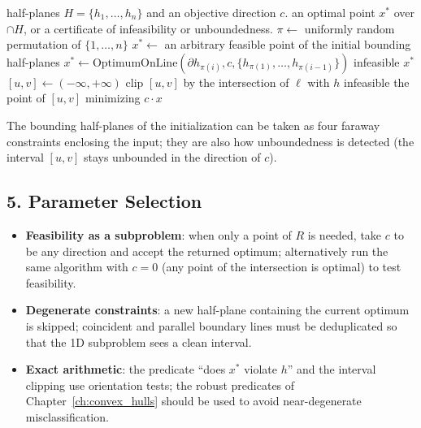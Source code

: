 \begin{algorithm}[htbp]
\caption{Seidel's Randomized Incremental 2D LP}
\label{alg:geo_duality_seidel_lp}
\begin{algorithmic}[1]
\Require half-planes $H = \{h_1, \dots, h_n\}$ and an objective direction $c$.
\Ensure an optimal point $x^*$ over $\cap H$, or a certificate of
       infeasibility or unboundedness.
  \State $\pi \gets$ uniformly random permutation of $\{1, \dots, n\}$
  \State $x^* \gets$ an arbitrary feasible point of the initial bounding
         half-planes
      \State $x^* \gets \text{OptimumOnLine}(\partial h_{\pi(i)}, c,
             \{h_{\pi(1)}, \dots, h_{\pi(i-1)}\})$
        \State \Return infeasible
      \EndIf
    \EndIf
  \EndFor
  \State \Return $x^*$
\EndFunction
{}
  \State $[u, v] \gets (-\infty, +\infty)$ 
    \State clip $[u,v]$ by the intersection of $\ell$ with $h$
  \EndFor
    \State \Return infeasible
  \EndIf
  \State \Return the point of $[u,v]$ minimizing $c \cdot x$
\EndFunction
\end{algorithmic}
\end{algorithm}

The bounding half-planes of the initialization can be taken as four faraway
constraints enclosing the input; they are also how unboundedness is
detected (the interval $[u,v]$ stays unbounded in the direction of $c$).

\subsection{5. Parameter Selection}

\begin{itemize}
\item \textbf{Feasibility as a subproblem}: when only a point of $R$ is
  needed, take $c$ to be any direction and accept the returned optimum;
  alternatively run the same algorithm with $c = 0$ (any point of the
  intersection is optimal) to test feasibility.
\item \textbf{Degenerate constraints}: a new half-plane containing the
  current optimum is skipped; coincident and parallel boundary lines must
  be deduplicated so that the 1D subproblem sees a clean interval.
\item \textbf{Exact arithmetic}: the predicate ``does $x^*$ violate $h$''
  and the interval clipping use orientation tests; the robust predicates of
  Chapter~\ref{ch:convex_hulls} should be used to avoid near-degenerate
  misclassification.
\end{itemize}

